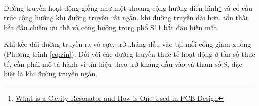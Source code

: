         Đường truyền hoạt động giống như một khoang cộng hưởng điển hình\footnote{\href{https://resources.pcb.cadence.com/blog/2019-what-is-a-cavity-resonator-and-how-is-one-used-in-pcb-design}{\color{blue}What is a Cavity Resonator and How is One Used in PCB Design}} và có cấu trúc cộng hưởng khi đường truyền rất ngắn. khi đường truyền dài hơn, tổn thất bắt đầu chiếm ưu thế và cộng hưởng trong phổ S11 bắt đầu biến mất.\cite{cadence2021transmission}\par
        Khi kéo dài đường truyền ra vô cực, trở kháng đầu vào tại mỗi cổng giảm xuống (Phương trình \ref{eq:zin}). Đối với các đường truyền thực tế hoạt động ở tần số thực tế, cần phải mô tả hành vi tín hiệu theo trở kháng đầu vào và tham số S, đặc biệt là khi đường truyền ngắn.\cite{cadence2021transmission}\par